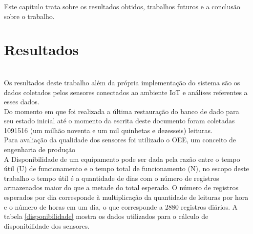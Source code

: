 
\quad Este capítulo trata sobre os resultados obtidos, trabalhos futuros e a conclusão sobre o trabalho.

\section{Resultados}
\\\null \quad Os resultados deste trabalho além da própria implementação do sistema são os dados coletados pelos sensores conectados ao ambiente \acrshort{IoT} e análises referentes a esses dados.
\\\null \quad Do momento em que foi realizada a última restauração do banco de dado para seu estado inicial até o momento da escrita deste documento foram coletadas 1091516 (um milhão noventa e um mil quinhetas e dezesseis) leituras.
\\\null \quad Para avaliação da qualidade dos sensores foi utilizado o \acrfull{OEE}, um conceito de engenharia de produção
\\\null \quad A Disponibilidade de um equipamento pode ser dada pela razão entre o tempo útil (U) de funcionamento e o tempo total de funcionamento (N), no escopo deste trabalho o tempo útil é a quantidade de dias com o número de registros armazenados maior do que a metade do total esperado. O número de registros esperados por dia corresponde à multiplicação da quantidade de leituras por hora e o número de horas em um dia, o que corresponde a 2880 registros diários. A tabela \ref{disponibilidade} mostra os dados utilizados para o cálculo de disponibilidade dos sensores.

